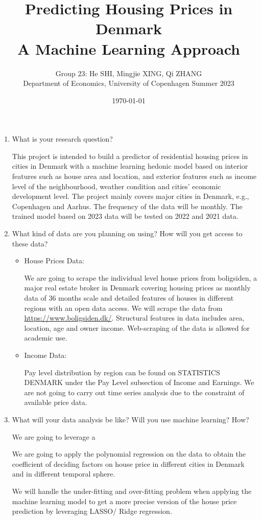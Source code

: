 \documentclass[12pt]{article} %
\title{Predicting Housing Prices in Denmark\\ A Machine Learning Approach}
\author{Group 23: He SHI, Mingjie XING, Qi ZHANG\\Department of Economics, University of Copenhagen Summer 2023}
\date{\today} %
\begin{document}
\maketitle


\begin{enumerate}

  \item What is your research question?\par
  		This project is intended to build a predictor of residential housing prices in cities in Denmark with a machine learning hedonic model based on interior features such as house area and location, and exterior features such as income level of the neighbourhood, weather condition and cities' economic development level. The project mainly covers major cities in Denmark, e.g., Copenhagen and Aarhus. The frequency of the data will be monthly. The trained model based on 2023 data will be tested on 2022 and 2021 data. 

  \item What kind of data are you planning on using? How will you get access to these data?
  	\begin{itemize}
		\item House Prices Data: \par
			We are going to scrape the individual level house prices from boligsiden, a major real estate broker in Denmark covering housing prices as monthly data of 36 months scale and detailed features of houses in different regions with an open data access. We will scrape the data from \url{https://www.boligsiden.dk/}. Structural features in data includes area, location, age and owner income. Web-scraping of the data is allowed for academic use.
		\item Income Data:\par
			Pay level distribution by region can be found on STATISTICS DENMARK under the Pay Level subsection of Income and Earnings. We are not going to carry out time series analysis due to the constraint of available price data.
	\end{itemize}

  \item What will your data analysis be like? Will you use machine learning? How?\par
		We are going to leverage a \par
		We are going to apply the polynomial regression on the data to obtain the coefficient of deciding factors on house price in different cities in Denmark and in different temporal sphere.\par
		We will handle the under-fitting and over-fitting problem when applying the machine learning model to get a more precise version of the house price prediction by leveraging LASSO/ Ridge regression.\par
		

\end{enumerate}
\end{document}

